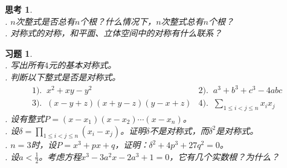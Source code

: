 \documentclass[12pt,UTF8]{ctexbook}
\theoremstyle{definition}
\theoremstyle{plain}
\newtheorem{sk}{思考}[section]
\newtheorem{xt}{习题}[section]
\begin{document}



\begin{sk}
    \mbox{} \\
    . $n$次整式是否总有$n$个根？什么情况下，$n$次整式总有$n$个根？\\
    . 对称式的对称，和平面、立体空间中的对称有什么联系？

\end{sk}

\begin{xt}
    \mbox{} \\
    . 写出所有$4$元的基本对称式。\\
    . 判断以下整式是否是对称式。\\
    $$
    \begin{array}{ll}
       1).\;\; x^2 + xy - y^2 & 2).\;\; a^3 + b^3 + c^3 - 4abc \\
       3).\;\;  (x - y + z)(x + y - z)(y - x + z) & 4).\;\; \displaystyle\sum_{1\leqslant i < j \leqslant n} x_i x_j
    \end{array}
    $$
    . 设有整式$P = (x - x_1)(x - x_2) \cdots (x - x_n)$。\\
    . 设$\displaystyle\delta = \prod_{1\leqslant i < j \leqslant n} (x_i - x_j)$。证明$\delta$不是对称式，而$\delta^2$是对称式。\\
    . $n=3$时，设$P = x^3 + px + q$，证明：$\delta^2 + 4p^3 + 27 q^2 = 0$。\\
    . 设$a<\frac{1}{2}$。考虑方程$x^3 - 3a^2x - 2a^3 + 1 = 0$，它有几个实数根？为什么？
\end{xt}
\end{document}
